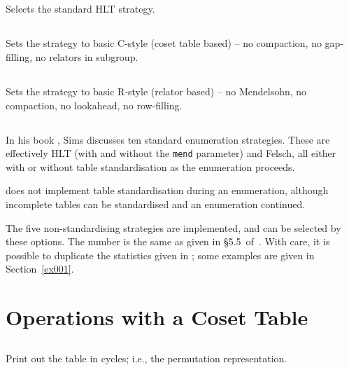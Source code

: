 \subsection{}
\label{cmd:hlt}
Selects the standard HLT strategy.

\subsection{}
\label{cmd:pure ct}
Sets the strategy to basic C-style (coset table based) -- no compaction, no
gap-filling, no relators in subgroup.

\subsection{}
\label{cmd:pure rt}
Sets the strategy to basic R-style (relator based) -- no Mendelsohn, no
compaction, no lookahead, no row-filling.

\subsection{}
\label{cmd:sims}
In his book \cite{Sim}, Sims discusses ten standard enumeration strategies.
These are effectively HLT (with and without the {\tt mend} parameter) and
Felsch, all either with or without table standardisation as the enumeration
proceeds.

{\ace} does not implement table standardisation during an enumeration, 
although incomplete tables can be standardised and an enumeration
continued.

The five non-standardising strategies are implemented, and can be selected
by these options.  The number is the same as given in \S5.5~of~\cite{Sim}.
With care, it is possible to duplicate the statistics given in \cite{Sim};
some examples are given in Section~\ref{ex001}.

\section{Operations with a Coset Table}
\label{sec:opwith}

\subsection{}
\label{cmd:cycles}

Print out the table in cycles; i.e., the permutation representation.

